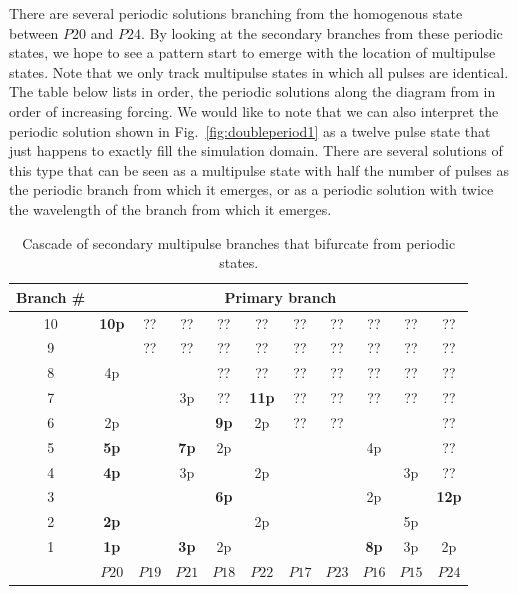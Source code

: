\documentclass[api,pof,pre,12pt,a4paper]{revtex4-1}
\begin{document}
There are several periodic solutions branching from the homogenous state between $P20$ and $P24$.  By looking at the secondary branches from these periodic states, we hope to see a pattern start to emerge with the location of multipulse states.  Note that we only track multipulse states in which all pulses are identical.  The table below lists in order, the periodic solutions along the diagram from in order of increasing forcing.  We would like to note that we can also interpret the periodic solution shown in Fig.~\ref{fig:doubleperiod1} as a twelve pulse state that just happens to exactly fill the simulation domain.  There are several solutions of this type that can be seen as a multipulse state with half the number of pulses as the periodic branch from which it emerges, or as a periodic solution with twice the wavelength of the branch from which it emerges.  



\begin{table}[ht]
\caption{Cascade of secondary multipulse branches that bifurcate from periodic states.} %
\centering %
\begin{tabular}{c | c c c c c c c c c c} %
\hline\hline %
 Branch \# &\multicolumn{10}{c}{ Primary branch}\\
\hline  %
10 	&\textbf{10p} &??		&??		&??		&??		&??		&??		&??		&??		&??	\\
9	&      		&??		&??		&??	 	&??		&??		&??		&??		&??		&??	\\
8	&4p  		&		&		&??	 	&??		&??		&??		&??		&??		&??	\\
7	&      		&		&3p		&??	 	&\textbf{11p}	&??		&??		&??		&??		&??	\\
6	& 2p    		&		&		&\textbf{9p} 	&2p		&??		&??		&		&		&??	\\
5	&\textbf{5p}  	&		&\textbf{7p}	&2p	 	&		&		&		&4p		&		&??	\\
4	&\textbf{4p} 	&		&3p		&	 	&2p		&		&		&		&3p		&??	\\
3	&      		&		&		&\textbf{6p} 	&		&		&		&2p		&		&\textbf{12p}	\\
2	&\textbf{2p} 	&		&		&	 	&2p		&		&		&		&5p		&	\\
1	&\textbf{1p}  	&		&\textbf{3p}	&2p	 	&		&		&		&\textbf{8p}	&3p		&2p	\\
\hline %
 	&$P20$	&$P19$	&$P21$	&$P18$	&$P22$	&$P17$	&$P23$	&$P16$	&$P15$	&$P24$ \\ [1ex] %
\hline %
\end{tabular}
\label{table:multipulse} %
\end{table} 
\end{document}
